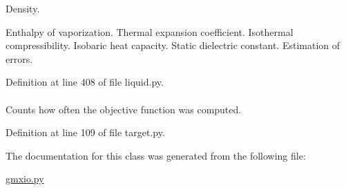 \-Density. 

\-Enthalpy of vaporization. \-Thermal expansion coefficient. \-Isothermal compressibility. \-Isobaric heat capacity. \-Static dielectric constant. \-Estimation of errors. 

\-Definition at line 408 of file liquid.\-py.

\hypertarget{classforcebalance_1_1target_1_1Target_ad4cd0ab38d8fc97d3e7a6e22ce130a16}{
\paragraph[{xct}]{}}\label{classforcebalance_1_1target_1_1Target_ad4cd0ab38d8fc97d3e7a6e22ce130a16}


\-Counts how often the objective function was computed. 



\-Definition at line 109 of file target.\-py.



\-The documentation for this class was generated from the following file\-:\begin{DoxyCompactItemize}
\item 
\hyperlink{gmxio_8py}{gmxio.\-py}\end{DoxyCompactItemize}
